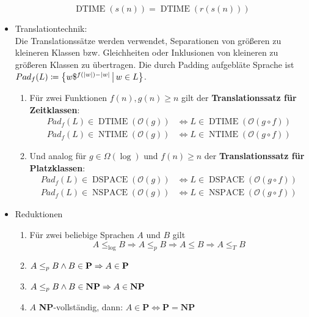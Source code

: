 \documentclass[landscape, 8pt, a4paper]{extarticle}
\newcommand{\poly}{\textbf{P}}
\newcommand{\npoly}{\textbf{NP}}
\newcommand{\set}[2]{\ensuremath\left\{ #1 \,\middle|\, #2 \right\}}
\begin{document}
\begin{multicols}{3}
\begin{itemize}
		\begin{equation*}
			\operatorname{DTIME}(s(n))=\operatorname{DTIME}(r(s(n)))
		\end{equation*}
		\item Translationtechnik:\\
		Die Translationssätze werden verwendet, Separationen von größeren zu kleineren Klassen bzw. Gleichheiten oder Inklusionen von kleineren zu größeren Klassen zu übertragen.
		Die durch Padding aufgebläte Sprache ist $Pad_f(L)\coloneqq \set{w\$^{f(|w|)-|w|}}{w\in L}$.
		\begin{enumerate}
			\item Für zwei Funktionen $f(n),g(n)\geq n$ gilt der \textbf{Translationssatz für Zeitklassen}:
			\begin{align*}
				Pad_f(L)\in \operatorname{DTIME}(\mathcal O(g))&\Leftrightarrow L\in \operatorname{DTIME}(\mathcal O(g\circ f))\\
				Pad_f(L)\in \operatorname{NTIME}(\mathcal O(g))&\Leftrightarrow L\in \operatorname{NTIME}(\mathcal O(g\circ f))
			\end{align*}
			\item Und analog für $g\in\Omega(\log)$ und $f(n)\geq n$ der \textbf{Translationssatz für Platzklassen}:
			\begin{align*}
				Pad_f(L)\in \operatorname{DSPACE}(\mathcal O(g))&\Leftrightarrow L\in \operatorname{DSPACE}(\mathcal O(g\circ f))\\
				Pad_f(L)\in \operatorname{NSPACE}(\mathcal O(g))&\Leftrightarrow L\in \operatorname{NSPACE}(\mathcal O(g\circ f))
			\end{align*}
		\end{enumerate}
		\item Reduktionen
		\begin{enumerate}
			\item	Für zwei beliebige Sprachen $A$ und $B$ gilt
			\begin{equation*}
				A\leq_{\log}B\Rightarrow A\leq_p B\Rightarrow A\leq B\Rightarrow A\leq_T B
			\end{equation*}
			\item $A\leq_p B\wedge B\in \text{\poly}\Rightarrow A\in\text{\poly}$
			\item $A\leq_p B\wedge B\in \text{\npoly}\Rightarrow A\in\text{\npoly}$
			\item $A$ \npoly-vollständig, dann: $A\in \poly \Leftrightarrow \poly=\npoly$
		\end{enumerate}
	\end{itemize}


\end{multicols}
\end{document}
